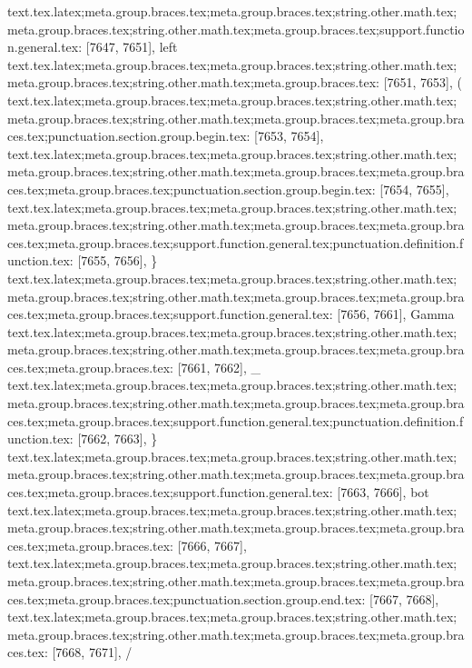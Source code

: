 {{{{{{{{{{{{{{{{{{{{{{{{{{{{{{{{{{{{{{{{{{{{{{{{{{{{{{{{{{{{{{{{{{{{{{{{{{{{{{{{{{{{{{{{{{{{{{{{{{{{{{{{{{{{{{{{{{{{{{{{{{{{{{{{{{{{{{{{{{{{{{{{{{{{{{{{{{{{{{{{{{{{{{{{{{{{{{{{{{{{{{{{{{{{{{{{{{{{{{{{{{{{{{{{{{{{{{{text.tex.latex;meta.group.braces.tex;meta.group.braces.tex;string.other.math.tex;meta.group.braces.tex;string.other.math.tex;meta.group.braces.tex;support.function.general.tex: [7647, 7651], {left}
text.tex.latex;meta.group.braces.tex;meta.group.braces.tex;string.other.math.tex;meta.group.braces.tex;string.other.math.tex;meta.group.braces.tex: [7651, 7653], {( }
text.tex.latex;meta.group.braces.tex;meta.group.braces.tex;string.other.math.tex;meta.group.braces.tex;string.other.math.tex;meta.group.braces.tex;meta.group.braces.tex;punctuation.section.group.begin.tex: [7653, 7654], {{}
text.tex.latex;meta.group.braces.tex;meta.group.braces.tex;string.other.math.tex;meta.group.braces.tex;string.other.math.tex;meta.group.braces.tex;meta.group.braces.tex;meta.group.braces.tex;punctuation.section.group.begin.tex: [7654, 7655], {{}
text.tex.latex;meta.group.braces.tex;meta.group.braces.tex;string.other.math.tex;meta.group.braces.tex;string.other.math.tex;meta.group.braces.tex;meta.group.braces.tex;meta.group.braces.tex;support.function.general.tex;punctuation.definition.function.tex: [7655, 7656], {\}
text.tex.latex;meta.group.braces.tex;meta.group.braces.tex;string.other.math.tex;meta.group.braces.tex;string.other.math.tex;meta.group.braces.tex;meta.group.braces.tex;meta.group.braces.tex;support.function.general.tex: [7656, 7661], {Gamma}
text.tex.latex;meta.group.braces.tex;meta.group.braces.tex;string.other.math.tex;meta.group.braces.tex;string.other.math.tex;meta.group.braces.tex;meta.group.braces.tex;meta.group.braces.tex: [7661, 7662], {_}
text.tex.latex;meta.group.braces.tex;meta.group.braces.tex;string.other.math.tex;meta.group.braces.tex;string.other.math.tex;meta.group.braces.tex;meta.group.braces.tex;meta.group.braces.tex;support.function.general.tex;punctuation.definition.function.tex: [7662, 7663], {\}
text.tex.latex;meta.group.braces.tex;meta.group.braces.tex;string.other.math.tex;meta.group.braces.tex;string.other.math.tex;meta.group.braces.tex;meta.group.braces.tex;meta.group.braces.tex;support.function.general.tex: [7663, 7666], {bot}
text.tex.latex;meta.group.braces.tex;meta.group.braces.tex;string.other.math.tex;meta.group.braces.tex;string.other.math.tex;meta.group.braces.tex;meta.group.braces.tex;meta.group.braces.tex: [7666, 7667], { }
text.tex.latex;meta.group.braces.tex;meta.group.braces.tex;string.other.math.tex;meta.group.braces.tex;string.other.math.tex;meta.group.braces.tex;meta.group.braces.tex;meta.group.braces.tex;punctuation.section.group.end.tex: [7667, 7668], {}}
text.tex.latex;meta.group.braces.tex;meta.group.braces.tex;string.other.math.tex;meta.group.braces.tex;string.other.math.tex;meta.group.braces.tex;meta.group.braces.tex: [7668, 7671], { / }
}}}}}}}}}}}}}}}}}}}}}}}}}}}}}}}}}}}}}}}}}}}}}}}}}}}}}}}}}}}}}}}}}}}}}}}}}}}}}}}}}}}}}}}}}}}}}}}}}}}}}}}}}}}}}}}}}}}}}}}}}}}}}}}}}}}}}}}}}}}}}}}}}}}}}}}}}}}}}}}}}}}}}}}}}}}}}}}}}}}}}}}}}}}}}}}}}}}}}}}}}}}}}}}}}}}}}}}}}}
